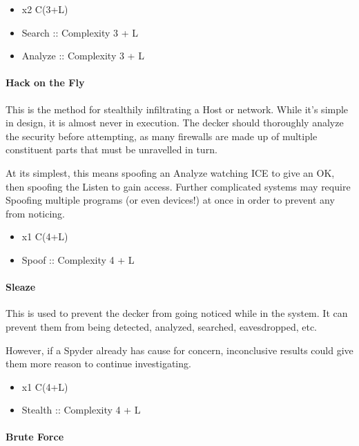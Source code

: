 \begin{multicols}{2}
	\begin{itemize}
		\itemsep 0pt
		\item x2 C(3+L)
		\item Search :: Complexity 3 + L
		\item Analyze :: Complexity 3 + L
	\end{itemize}
	
	\paragraph{Hack on the Fly}
	
	This is the method for stealthily infiltrating a Host or network. While it's simple in design, it is almost never in execution. The decker should thoroughly analyze the security before attempting, as many firewalls are made up of multiple constituent parts that must be unravelled in turn. 
	
	At its simplest, this means spoofing an Analyze watching ICE to give an OK, then spoofing the Listen to gain access. Further complicated systems may require Spoofing multiple programs (or even devices!) at once in order to prevent any from noticing.
	
	\begin{itemize}
		\itemsep 0pt
		\item x1 C(4+L)
		\item Spoof :: Complexity 4 + L
	\end{itemize}
	
	\paragraph{Sleaze}
	
	This is used to prevent the decker from going noticed while in the system. It can prevent them from being detected, analyzed, searched, eavesdropped, etc. 
	
	However, if a Spyder already has cause for concern, inconclusive results could give them more reason to continue investigating.
	
	\begin{itemize}
		\itemsep 0pt
		\item x1 C(4+L)
		\item Stealth :: Complexity 4 + L
	\end{itemize}
	
	\paragraph{Brute Force}
	

\end{multicols}
